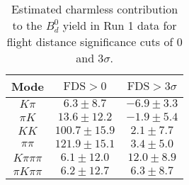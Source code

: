 \begin{table}[h]
  \centering
  \begin{tabular}{ccc}
      \toprule
      Mode & $\mathrm{FDS} > 0$ & $\mathrm{FDS} > 3\sigma$ \\
      \midrule
      $K\pi$ & $6.3 \pm 8.7$ & $-6.9 \pm 3.3$ \\
      $\pi K$ & $13.6 \pm 12.2$ & $-1.9 \pm 5.4$ \\
      $KK$ & $100.7 \pm 15.9$ & $2.1 \pm 7.7$ \\
      $\pi\pi$ & $121.9 \pm 15.1$ & $3.4 \pm 5.0$ \\
      $K\pi\pi\pi$ & $6.1 \pm 12.0$ & $12.0 \pm 8.9$ \\
      $\pi K\pi\pi$ & $6.2 \pm 12.7$ & $6.3 \pm 8.7$ \\
      \bottomrule
  \end{tabular}
  \caption{\small Estimated charmless contribution to the $B^{0}_{d}$ yield in Run 1 data for flight distance significance cuts of 0  and $3\sigma$.}
\label{tab:charmless_yields_Bd_run_1}
\end{table}
